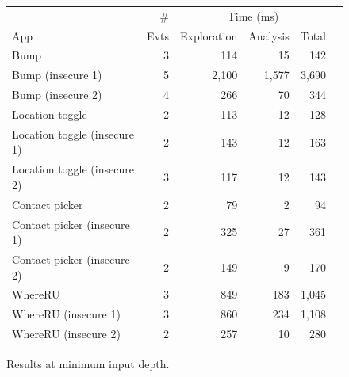 \documentclass{llncs}
\begin{document}
\begin{figure}[t]
\centering
\begin{tabular}{ | l | r | r | r | r | r | }
  \hline
  &\#&\multicolumn{3}{c|}{Time (ms)} \\ \cline{3-5} %
App & Evts & Exploration & Analysis & Total \\ \hline %
  \hline
  Bump & 3 & 114 &  15 & 142 \\ %
  Bump (insecure 1) & 5 & 2,100 & 1,577 & 3,690 \\ %
  Bump (insecure 2) & 4 & 266 & 70 & 344 \\\hline %
  Location toggle & 2 &  113 & 12 & 128 \\ %
  Location toggle (insecure 1) & 2 &  143 & 12 & 163 \\ %
  Location toggle (insecure 2) & 3 & 117 & 12 & 143 \\\hline %
  Contact picker & 2 &  79 & 2 & 94 \\ %
  Contact picker (insecure 1) & 2 &  325 & 27 & 361 \\ %
  Contact picker (insecure 2) & 2 &  149 & 9 & 170 \\\hline %
  WhereRU & 3 & 849 & 183 & 1,045 \\ %
  WhereRU (insecure 1) & 3 & 860 & 234 & 1,108 \\ %
  WhereRU (insecure 2) & 2 & 257 & 10 & 280 \\ %
  \hline
\end{tabular}
\caption{Results at minimum input depth.}
\label{fig:results}
\end{figure}
\end{document}
